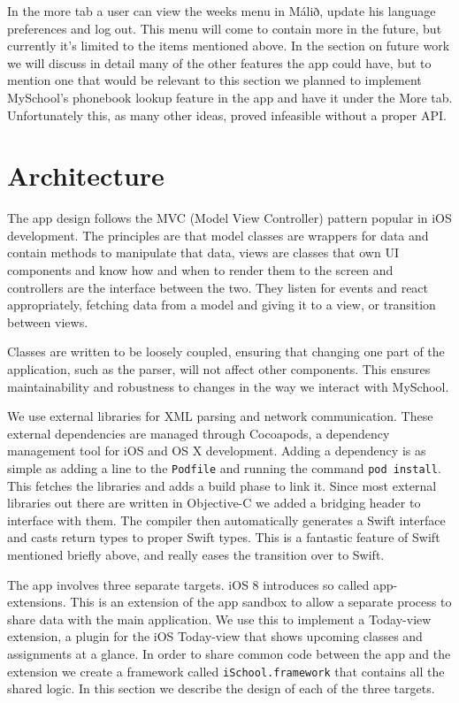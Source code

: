 \documentclass[pdftex, DIV=calc, paper=a4, fontsize=11pt]{scrartcl}	 %
\begin{document}
In the more tab a user can view the weeks menu in Málið, update his language preferences and log out.
This menu will come to contain more in the future, but currently it's limited to the items mentioned
above. In the section on future work we will discuss in detail many of the other features the app 
could have, but to mention one that would be relevant to this section we planned to implement
MySchool's phonebook lookup feature in the app and have it under the More tab. Unfortunately this, as
many other ideas, proved infeasible without a proper API.



\section{Architecture}
\label{sec:arch}

The app design follows the MVC (Model View Controller) pattern popular in iOS development.
The principles are that model classes are wrappers for data and contain methods to manipulate that
data, views are classes that own UI components and know how and when to render them to the screen
and controllers are the interface between the two. They listen for events and react appropriately, 
fetching data from a model and giving it to a view, or transition between views.

Classes are written to be loosely coupled, ensuring that changing one part of the application, such 
as the parser, will not affect other components. This ensures maintainability and robustness to
changes in the way we interact with MySchool.

We use external libraries for XML parsing and network communication. These external dependencies 
are managed through Cocoapods\cite{pods}, a dependency management tool for iOS and OS X development. Adding
a dependency is as simple as adding a line to the \texttt{Podfile} and running the command
\texttt{pod install}. This fetches the libraries and adds a build phase to link it. Since most
external libraries out there are written in Objective-C we added a bridging header to interface
with them. The compiler then automatically generates a Swift interface and casts return types to 
proper Swift types. This is a fantastic feature of Swift mentioned briefly above, and really eases
the transition over to Swift.

The app involves three separate targets. iOS 8 introduces so called app-extensions\cite{extensions}. This is an extension
of the app sandbox to allow a separate process to share data with the main application. We use
this to implement a Today-view extension, a plugin for the iOS Today-view that shows upcoming classes
and assignments at a glance. In order to share common code between the app and the extension we
create a framework called \texttt{iSchool.framework} that contains all the shared logic. In this 
section we describe the design of each of the three targets.
\end{document}
